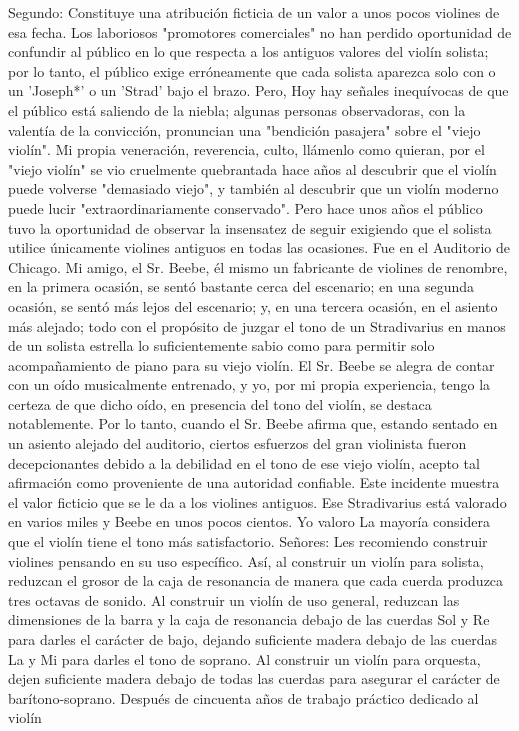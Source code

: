 Segundo: Constituye una atribución ficticia de un valor a unos pocos violines de esa fecha.
Los laboriosos "promotores comerciales" no han perdido oportunidad de confundir al público en lo que respecta a los antiguos valores del violín solista; por lo tanto, el público exige erróneamente que cada solista aparezca solo con
o un 'Joseph*' o un 'Strad' bajo el brazo. Pero,
Hoy hay señales inequívocas de que el público está saliendo de la niebla; algunas personas observadoras, con la valentía de la convicción, pronuncian una "bendición pasajera" sobre el "viejo violín". Mi propia veneración, reverencia, culto, llámenlo como quieran, por el "viejo violín" se vio cruelmente quebrantada hace años al descubrir que el violín puede volverse "demasiado viejo", y también al descubrir que un violín moderno puede lucir "extraordinariamente conservado".
Pero hace unos años el público tuvo la oportunidad de observar la insensatez de seguir exigiendo que el solista utilice únicamente violines antiguos en todas las ocasiones. Fue en el Auditorio de Chicago. Mi amigo, el Sr. Beebe, él mismo un fabricante de violines de renombre, en la primera ocasión, se sentó bastante
cerca del escenario; en una segunda ocasión, se sentó más lejos del escenario; y, en una tercera ocasión, en el asiento más alejado; todo con el propósito de juzgar el tono de un Stradivarius en manos de un solista estrella lo suficientemente sabio como para permitir solo acompañamiento de piano para su viejo violín. El Sr. Beebe se alegra de contar con un oído musicalmente entrenado, y yo, por mi propia experiencia, tengo la certeza de que dicho oído, en presencia del tono del violín, se destaca notablemente. Por lo tanto, cuando el Sr. Beebe afirma que, estando sentado en un asiento alejado del auditorio, ciertos esfuerzos del gran violinista fueron decepcionantes debido a la debilidad en el tono de ese viejo violín, acepto tal afirmación como proveniente de una autoridad confiable. Este incidente muestra el valor ficticio que se le da a los violines antiguos. Ese Stradivarius está valorado en varios miles y Beebe en unos pocos cientos. Yo valoro
La mayoría considera que el violín tiene el tono más satisfactorio.
Señores: Les recomiendo construir violines pensando en su uso específico. Así, al construir un violín para solista, reduzcan el grosor de la caja de resonancia de manera que cada cuerda produzca tres octavas de sonido. Al construir un violín de uso general, reduzcan las dimensiones de la barra y la caja de resonancia debajo de las cuerdas Sol y Re para darles el carácter de bajo, dejando suficiente madera debajo de las cuerdas La y Mi para darles el tono de soprano. Al construir un violín para orquesta, dejen suficiente madera debajo de todas las cuerdas para asegurar el carácter de barítono-soprano.
Después de cincuenta años de trabajo práctico dedicado al violín 

